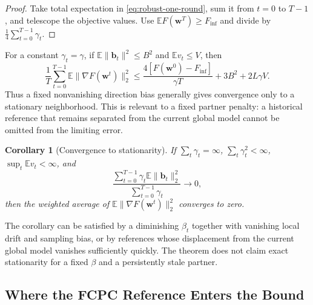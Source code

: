 \documentclass[journal,twoside,web]{ieeecolor}
\newtheorem{corollary}{Corollary}
\begin{document}
\begin{proof}
Take total expectation in \eqref{eq:robust-one-round}, sum it from $t=0$ to
$T-1$, and telescope the objective values. Use
$\mathbb E F(\bm w^T)\geq F_{\inf}$ and divide by
$\frac14\sum_{t=0}^{T-1}\gamma_t$.
\end{proof}

For a constant $\gamma_t=\gamma$, if
$\mathbb E\|\bm b_t\|^2\leq B^2$ and $\mathbb E v_t\leq V$, then
\begin{equation}
 \frac1T\sum_{t=0}^{T-1}\mathbb E\|\nabla F(\bm w^t)\|_2^2
 \leq\frac{4[F(\bm w^0)-F_{\inf}]}{\gamma T}
 +3B^2+2L\gamma V.                                      \label{eq:constant-step-bound}
\end{equation}
Thus a fixed nonvanishing direction bias generally gives convergence only to
a stationary neighborhood. This is relevant to a fixed partner penalty: a
historical reference that remains separated from the current global model
cannot be omitted from the limiting error.

\begin{corollary}[Convergence to stationarity]
If $\sum_t\gamma_t=\infty$, $\sum_t\gamma_t^2<\infty$,
$\sup_t\mathbb E v_t<\infty$, and
\begin{equation}
 \frac{\sum_{t=0}^{T-1}\gamma_t\mathbb E\|\bm b_t\|_2^2}
 {\sum_{t=0}^{T-1}\gamma_t}\longrightarrow0,
\end{equation}
then the weighted average of
$\mathbb E\|\nabla F(\bm w^t)\|_2^2$ converges to zero.
\end{corollary}

The corollary can be satisfied by a diminishing $\beta_t$ together with
vanishing local drift and sampling bias, or by references whose displacement
from the current global model vanishes sufficiently quickly. The theorem
does not claim exact stationarity for a fixed $\beta$ and a persistently stale
partner.

\subsection{Where the FCPC Reference Enters the Bound}
\end{document}
